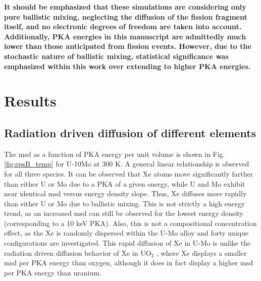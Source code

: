 \documentclass[review]{elsarticle}
\providecommand{\DIFaddtex}[1]{{\bf #1}} %
\providecommand{\DIFaddbegin}{\protect\color{blue}} %
\providecommand{\DIFaddend}{\protect\color{black}} %
\providecommand{\DIFadd}[1]{\texorpdfstring{\DIFaddtex{#1}}{#1}} %
\newcommand{\DIFaddincludegraphics}[2][]{{\color{blue}\fbox{\DIFOincludegraphics[#1]{#2}}}} %
\DeclareRobustCommand{\DIFaddbegin}{\DIFOaddbegin \let\includegraphics\DIFaddincludegraphics} %
\DeclareRobustCommand{\DIFaddend}{\DIFOaddend \let\includegraphics\DIFOincludegraphics} %
\begin{document}
\DIFaddbegin \DIFadd{It should be emphasized that these simulations are considering only pure ballistic mixing, neglecting the diffusion of the fission fragment itself, and no electronic degrees of freedom are taken into account. Additionally, PKA energies in this manuscript are admittedly much lower than those anticipated from fission events. However, due to the stochastic nature of ballistic mixing, statistical significance was emphasized within this work over extending to higher PKA energies. 
}

\DIFaddend \FloatBarrier

\section{Results}

\subsection{Radiation driven diffusion of different elements}

The msd as a function of PKA energy per unit volume is shown in Fig. \ref{fig:epsB_temp} for U-10Mo at 300 K. A general linear relationship is observed for all three species. It can be observed that Xe atoms move significantly farther than either U or Mo due to a PKA of a given energy, while U and Mo exhibit near identical msd versus energy density slope. Thus, Xe diffuses more rapidly than either U or Mo due to ballistic mixing. This is not strictly a high energy trend, as an increased msd can still be observed for the lowest energy density (corresponding to a 10 keV PKA). Also, this is not a compositional concentration effect, as the Xe is randomly dispersed within the U-Mo alloy and forty unique configurations are investigated. This rapid diffusion of Xe in U-Mo is unlike the radiation driven diffusion behavior of Xe in UO$_2$ \cite{cooper2016}, where Xe displays a smaller msd per PKA energy than oxygen, although it does in fact display a higher msd per PKA energy than uranium. 
\end{document}
